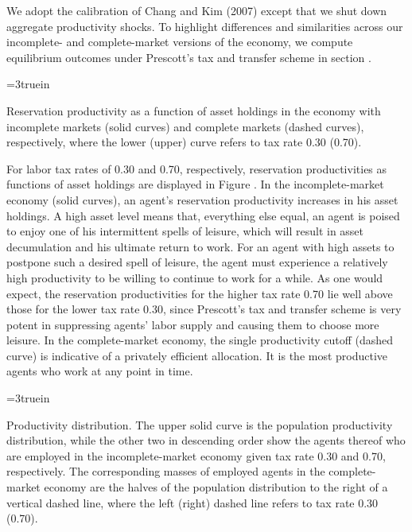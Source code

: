 We adopt the  calibration of Chang and Kim (2007)
except that we shut down  aggregate productivity
shocks. To highlight differences and similarities across our
incomplete- and complete-market versions of the economy, we
compute equilibrium outcomes under Prescott's tax and transfer
scheme in section .
%
%

\centerline{\epsfxsize=3truein}
\caption{Reservation productivity as a function of asset
holdings in the economy with incomplete markets (solid curves)
and complete markets (dashed curves), respectively, where the
lower (upper) curve refers to tax rate 0.30 (0.70).}
\endfigure


For labor tax rates of 0.30 and 0.70, respectively,
reservation productivities as functions of asset holdings are
displayed in Figure . In the incomplete-market
economy (solid curves), an agent's reservation productivity
increases in his asset holdings.
A high asset level means that, everything else equal, an agent
is poised to enjoy one of his intermittent spells of leisure,
which will result in asset decumulation and his ultimate return
to work. For an agent with high assets to postpone such a desired
spell of leisure, the agent must experience a relatively high
productivity to be willing to continue to work for a while.
As one would expect, the reservation productivities for the higher
tax rate 0.70 lie well above those for the lower tax
rate 0.30, since Prescott's tax and transfer scheme is very
potent in suppressing agents' labor supply and causing them to
choose more leisure. In the complete-market economy, the single
productivity cutoff (dashed curve) is indicative of a
privately efficient allocation. It is the most productive agents
who work at any point in time.

\centerline{\epsfxsize=3truein}
\caption{Productivity distribution. The upper solid curve is the
population productivity distribution, while the other two
in descending order show the agents thereof who are employed in the
incomplete-market economy given tax rate 0.30
and 0.70, respectively. The corresponding masses of employed agents
in the complete-market economy are the halves of the population
distribution to the right of a vertical dashed line,
where the left (right) dashed line refers to tax rate 0.30 (0.70).}
\endfigure



